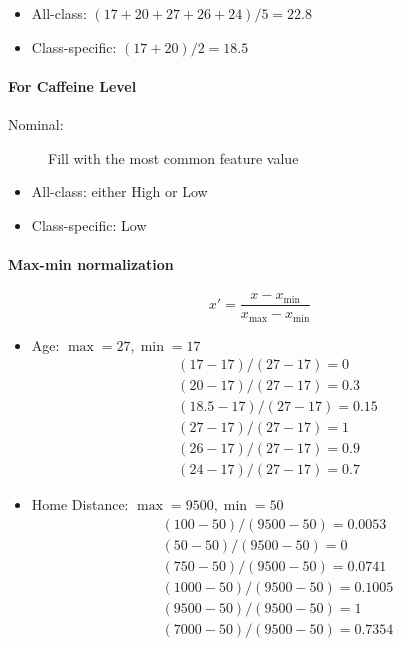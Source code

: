 \documentclass[12pt,a4paper]{article}
\begin{document}
\begin{itemize}
  \item All-class: $(17 + 20 + 27 + 26 + 24) / 5 = 22.8$
  \item Class-specific: $(17 + 20) / 2 = 18.5$
\end{itemize}

\paragraph{For Caffeine Level}
\begin{description}
  \item[Nominal:] Fill with the most common feature value
\end{description}
\begin{itemize}
  \item All-class: either High or Low
  \item Class-specific: Low
\end{itemize}

\paragraph{Max-min normalization}
\begin{equation}
  x' = \frac{x - x_{\min}}{x_{\max} - x_{\min}}
\end{equation}

\begin{itemize}
  \item Age: $\max = 27, \min = 17$
        \begin{align*}
           & (17-17)/(27-17) = 0      \\
           & (20-17)/(27-17) = 0.3    \\
           & (18.5-17)/(27-17) = 0.15 \\
           & (27-17)/(27-17) = 1      \\
           & (26-17)/(27-17) = 0.9    \\
           & (24-17)/(27-17) = 0.7
        \end{align*}
  \item Home Distance: $\max = 9500, \min = 50$
        \begin{align*}
           & (100-50)/(9500-50) = 0.0053  \\
           & (50-50)/(9500-50) = 0        \\
           & (750-50)/(9500-50) = 0.0741  \\
           & (1000-50)/(9500-50) = 0.1005 \\
           & (9500-50)/(9500-50) = 1      \\
           & (7000-50)/(9500-50) = 0.7354
        \end{align*}
\end{itemize}
\end{document}
